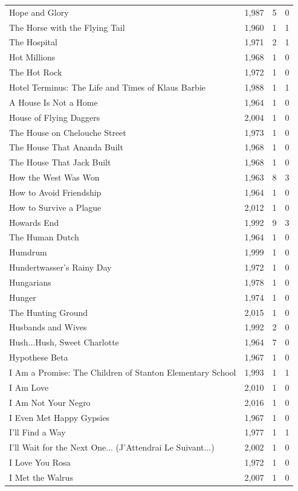 \begin{tabular}{lrrr}
Hope and Glory & 1,987 & 5 & 0 \\
The Horse with the Flying Tail & 1,960 & 1 & 1 \\
The Hospital & 1,971 & 2 & 1 \\
Hot Millions & 1,968 & 1 & 0 \\
The Hot Rock & 1,972 & 1 & 0 \\
Hotel Terminus: The Life and Times of Klaus Barbie & 1,988 & 1 & 1 \\
A House Is Not a Home & 1,964 & 1 & 0 \\
House of Flying Daggers & 2,004 & 1 & 0 \\
The House on Chelouche Street & 1,973 & 1 & 0 \\
The House That Ananda Built & 1,968 & 1 & 0 \\
The House That Jack Built & 1,968 & 1 & 0 \\
How the West Was Won & 1,963 & 8 & 3 \\
How to Avoid Friendship & 1,964 & 1 & 0 \\
How to Survive a Plague & 2,012 & 1 & 0 \\
Howards End & 1,992 & 9 & 3 \\
The Human Dutch & 1,964 & 1 & 0 \\
Humdrum & 1,999 & 1 & 0 \\
Hundertwasser's Rainy Day & 1,972 & 1 & 0 \\
Hungarians & 1,978 & 1 & 0 \\
Hunger & 1,974 & 1 & 0 \\
The Hunting Ground & 2,015 & 1 & 0 \\
Husbands and Wives & 1,992 & 2 & 0 \\
Hush...Hush, Sweet Charlotte & 1,964 & 7 & 0 \\
Hypothese Beta & 1,967 & 1 & 0 \\
I Am a Promise: The Children of Stanton Elementary School & 1,993 & 1 & 1 \\
I Am Love & 2,010 & 1 & 0 \\
I Am Not Your Negro & 2,016 & 1 & 0 \\
I Even Met Happy Gypsies & 1,967 & 1 & 0 \\
I'll Find a Way & 1,977 & 1 & 1 \\
I'll Wait for the Next One... (J'Attendrai Le Suivant...) & 2,002 & 1 & 0 \\
I Love You Rosa & 1,972 & 1 & 0 \\
I Met the Walrus & 2,007 & 1 & 0 \\

\end{tabular}
